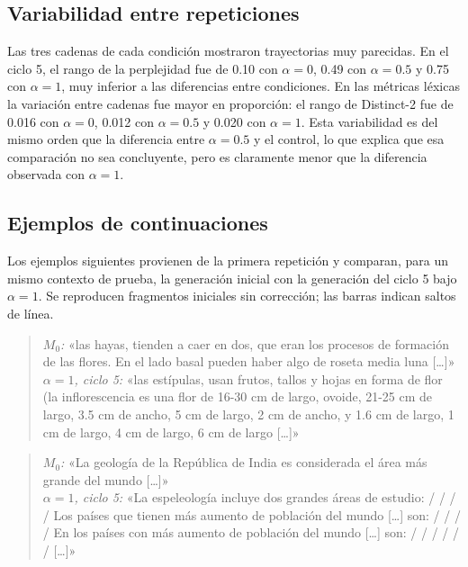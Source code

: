 \documentclass[12pt,letterpaper]{article}
\begin{document}
\subsection{Variabilidad entre repeticiones}

Las tres cadenas de cada condición mostraron trayectorias muy parecidas.
En el ciclo 5, el rango de la perplejidad fue de 0.10 con \(\alpha=0\),
0.49 con \(\alpha=0.5\) y 0.75 con \(\alpha=1\), muy inferior a las
diferencias entre condiciones. En las métricas léxicas la variación entre
cadenas fue mayor en proporción: el rango de Distinct-2 fue de 0.016 con
\(\alpha=0\), 0.012 con \(\alpha=0.5\) y 0.020 con \(\alpha=1\). Esta
variabilidad es del mismo orden que la diferencia entre \(\alpha=0.5\) y
el control, lo que explica que esa comparación no sea concluyente, pero es
claramente menor que la diferencia observada con \(\alpha=1\).

\subsection{Ejemplos de continuaciones}

Los ejemplos siguientes provienen de la primera repetición y comparan, para
un mismo contexto de prueba, la generación inicial con la generación del
ciclo 5 bajo \(\alpha=1\). Se reproducen fragmentos iniciales sin
corrección; las barras indican saltos de línea.

\begin{quote}\small
\textit{\(M_0\):} «las hayas, tienden a caer en dos, que eran los procesos
de formación de las flores. En el lado basal pueden haber algo de roseta
media luna [\ldots]»\\[0.3em]
\textit{\(\alpha=1\), ciclo 5:} «las estípulas, usan frutos, tallos y hojas
en forma de flor (la inflorescencia es una flor de 16-30 cm de largo,
ovoide, 21-25 cm de largo, 3.5 cm de ancho, 5 cm de largo, 2 cm de ancho,
y 1.6 cm de largo, 1 cm de largo, 4 cm de largo, 6 cm de largo [\ldots]»
\end{quote}

\begin{quote}\small
\textit{\(M_0\):} «La geología de la República de India es considerada el
área más grande del mundo [\ldots]»\\[0.3em]
\textit{\(\alpha=1\), ciclo 5:} «La espeleología incluye dos grandes áreas
de estudio: / / / / Los países que tienen más aumento de población del mundo
[\ldots] son: / / / / En los países con más aumento de población del mundo
[\ldots] son: / / / / / / [\ldots]»
\end{quote}
\end{document}
